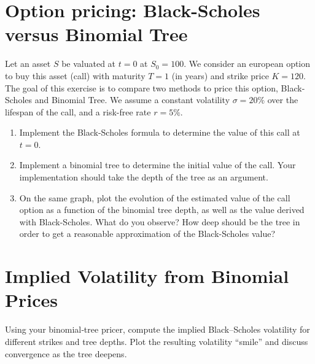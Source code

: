 \section*{Option pricing: Black-Scholes versus Binomial Tree}
Let an asset $S$ be valuated at $t=0$ at $S_0=100$. We consider an european option to buy this asset (call) with maturity $T = 1$ (in years) and strike price $K = 120$. The goal of this exercise is to compare two methods to price this option, Black-Scholes and Binomial Tree. We assume a constant volatility $\sigma=20\%$ over the lifespan of the call, and a risk-free rate $r=5\%$. 
\begin{enumerate}
    \item Implement the Black-Scholes formula to determine the value of this call at $t=0$.
    \item Implement a binomial tree to determine the initial value of the call. Your implementation should take the depth of the tree as an argument.
    \item On the same graph, plot the evolution of the estimated value of the call option as a function of the binomial tree depth, as well as the value derived with Black-Scholes. What do you observe? How deep should be the tree in order to get a reasonable approximation of the Black-Scholes value?
\end{enumerate}

\section*{Implied Volatility from Binomial Prices}
Using your binomial‐tree pricer, compute the implied Black–Scholes volatility for different strikes and tree depths. Plot the resulting volatility ``smile'' and discuss convergence as the tree deepens.

